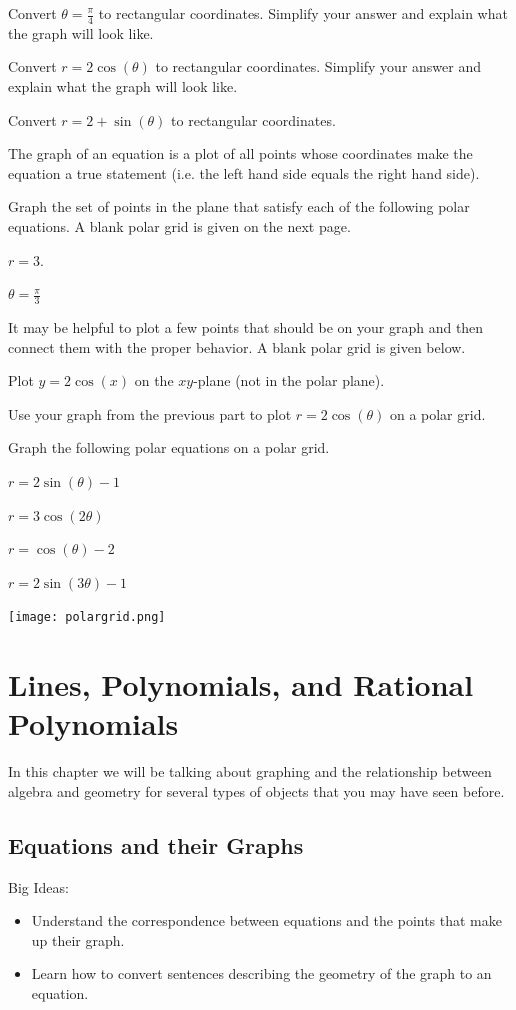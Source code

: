 \bq Convert $\theta=\frac{\pi}{4}$ to rectangular coordinates. Simplify your answer and explain what the graph will look like.
\eq

\bq Convert $r=2 \cos(\theta)$ to rectangular coordinates. Simplify your answer and explain what the graph will look like.
\eq

\bq Convert $r=2+\sin(\theta)$ to rectangular coordinates.
\eq

\begin{info} The graph of an equation is a plot of all points whose coordinates make the equation a true statement (i.e. the left hand side equals the right hand side).

\end{info}

\bq Graph the set of points in the plane that satisfy each of the following polar equations.
A blank polar grid  is given on the next page. \be
\item $r=3$.
\item $\theta=\frac{\pi}{3}$
\ee \eq

\bq It may be helpful to plot a few points that should be on your graph and then connect them with the proper behavior. A blank polar grid is given below.
\be
\item Plot $y=2\cos(x)$ on the $xy$-plane (not in the polar plane).
\item Use your graph from the previous part to plot $r=2\cos(\theta)$ on a polar grid.
\ee
\eq

\bq Graph the following  polar equations on a polar grid.
\be
\item $r=2\sin(\theta)-1$
\item $r=3\cos(2\theta)$
\item $r=\cos(\theta)-2$
\item $r=2\sin(3 \theta)-1$
\ee
\eq

\begin{center} \texttt{[image: polargrid.png]} \end{center}


\chapter{Lines, Polynomials, and Rational Polynomials}
In this chapter we will be talking about graphing and the relationship between algebra and geometry for several types of objects that you may have seen before.
\section{Equations and their Graphs}
Big Ideas:
\begin{itemize}
\item Understand the correspondence between equations and the points that make up their graph.
\item Learn how to convert sentences describing the geometry of the graph to an equation.
\end{itemize}

